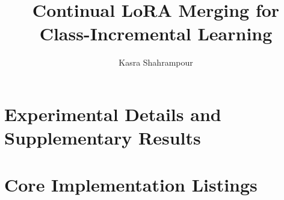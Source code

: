 \documentclass{DEIthesis}
\title{Continual LoRA Merging for Class-Incremental Learning}
\author{Kasra Shahrampour}
\begin{document}
\frontmatter
\maketitle
\blankpage







\tableofcontents
\listoffigures
\listoftables

\mainmatter


\blankpage

\blankpage

\blankpage

\blankpage

\blankpage

\blankpage

\backmatter

\chapter{Experimental Details and Supplementary Results}
\label{app:appendix1}


\chapter{Core Implementation Listings}
\label{app:code}

\end{document}
